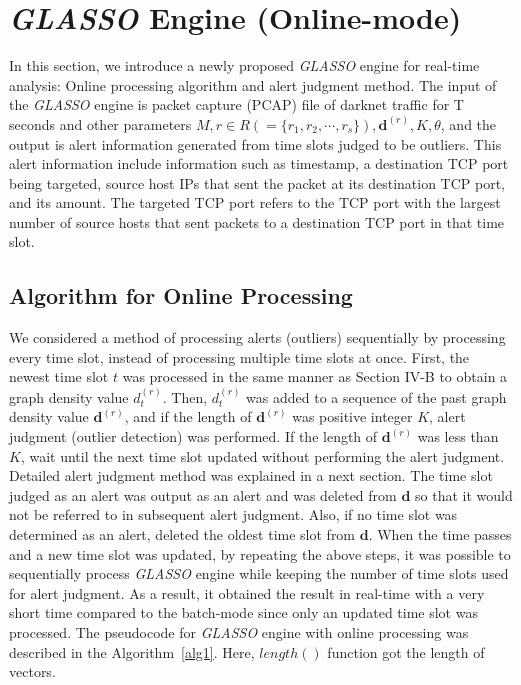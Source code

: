 \documentclass[conference]{IEEEtran}
\begin{document}
\section{{\it GLASSO} Engine (Online-mode)}
In this section, we introduce a newly proposed {\it GLASSO} engine for real-time analysis: Online processing algorithm and alert judgment method.
The input of the {\it GLASSO} engine is packet capture (PCAP) file of darknet traffic for T seconds and other parameters $M, r \in R ( = \{r_1, r_2, \cdots, r_s\} ), \bm{d}^{(r)}, K, \theta$, and the output is alert information generated from time slots judged to be outliers.
This alert information include information such as timestamp, a destination TCP port being targeted, source host IPs that sent the packet at its destination TCP port, and its amount.
The targeted TCP port refers to the TCP port with the largest number of source hosts that sent packets to a destination TCP port in that time slot.






\subsection{Algorithm for Online Processing}
We considered a method of processing alerts (outliers) sequentially by processing every time slot, instead of processing multiple time slots at once.
First, the newest time slot $t$ was processed in the same manner as Section I\hspace{-.1em}V-B to obtain a graph density value $d_t^{(r)}$.
Then, $d_t^{(r)}$ was added to a sequence of the past graph density value $\bm{d}^{(r)}$, and if the length of $\bm{d}^{(r)}$ was positive integer $K$, alert judgment (outlier detection) was performed.
If the length of $\bm{d}^{(r)}$ was less than $K$, wait until the next time slot updated without performing the alert judgment.
Detailed alert judgment method was explained in a next section.
The time slot judged as an alert was output as an alert and was deleted from $\bm{d}$ so that it would not be referred to in subsequent alert judgment.
Also, if no time slot was determined as an alert, deleted the oldest time slot from $\bm{d}$.
When the time passes and a new time slot was updated, by repeating the above steps, it was possible to sequentially process {\it GLASSO} engine while keeping the number of time slots used for alert judgment.
As a result, it obtained the result in real-time with a very short time compared to the batch-mode since only an updated time slot was processed.
The pseudocode for {\it GLASSO} engine with online processing was described in the Algorithm~\ref{alg1}.
Here, $length()$ function got the length of vectors.
\end{document}

